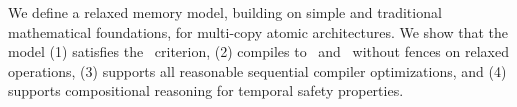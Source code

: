 We define a relaxed memory model, building on simple and traditional mathematical foundations,  for multi-copy atomic architectures.  We show that the model (1) satisfies the \drfsc\ criterion, (2)
compiles to \tso\ and \armeight\ without fences on relaxed operations, (3)
supports all reasonable sequential compiler optimizations, and (4) supports compositional reasoning for temporal safety properties.
